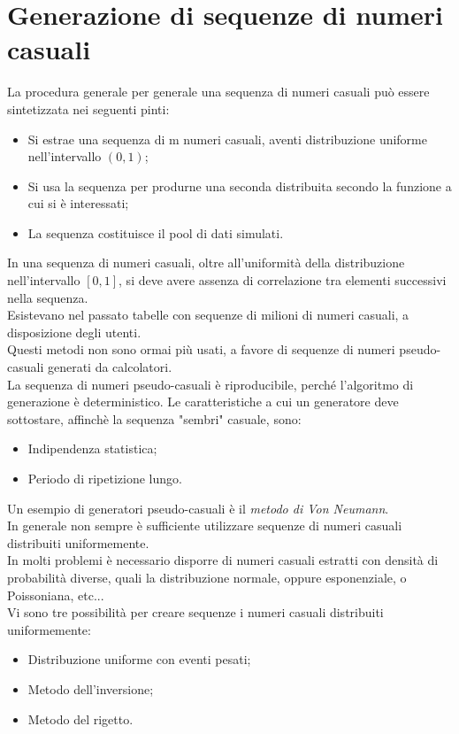 \documentclass[12pt, letterpaper]{book}
\begin{document}
\section{Generazione di sequenze di numeri casuali}
La procedura generale per generale una sequenza di numeri casuali può essere sintetizzata nei seguenti pinti:
\begin{itemize}
    \item Si estrae una sequenza di m numeri casuali, aventi distribuzione uniforme nell’intervallo $(0,1)$;
    \item Si usa la sequenza per produrne una seconda distribuita secondo la funzione a cui si è interessati;
    \item La sequenza costituisce il pool di dati simulati.
\end{itemize}
In una sequenza di numeri casuali, oltre all’uniformità della distribuzione nell’intervallo $[0,1]$, si deve avere assenza di correlazione tra elementi successivi nella sequenza.\\
Esistevano nel passato tabelle con sequenze di milioni di numeri casuali, a disposizione degli utenti.\\
Questi metodi non sono ormai più usati, a favore di sequenze di numeri pseudo-casuali generati da calcolatori.\\
La sequenza di numeri pseudo-casuali è riproducibile, perché l’algoritmo di generazione è deterministico. Le caratteristiche a cui un generatore deve sottostare, affinchè la sequenza "sembri" casuale, sono:
\begin{itemize}
    \item Indipendenza statistica;
    \item Periodo di ripetizione lungo.
\end{itemize}
Un esempio di generatori pseudo-casuali è il \textit{metodo di Von Neumann}.\\
In generale non sempre è sufficiente utilizzare sequenze di numeri casuali distribuiti uniformemente.\\
In molti problemi è necessario disporre di numeri casuali estratti con densità di probabilità diverse, quali la distribuzione normale, oppure esponenziale, o Poissoniana, 
etc...\\
Vi sono tre possibilità per creare sequenze i numeri casuali distribuiti uniformemente:
\begin{itemize}
    \item Distribuzione uniforme con eventi pesati;
    \item Metodo dell'inversione;
    \item Metodo del rigetto.
\end{itemize}
\end{document}
